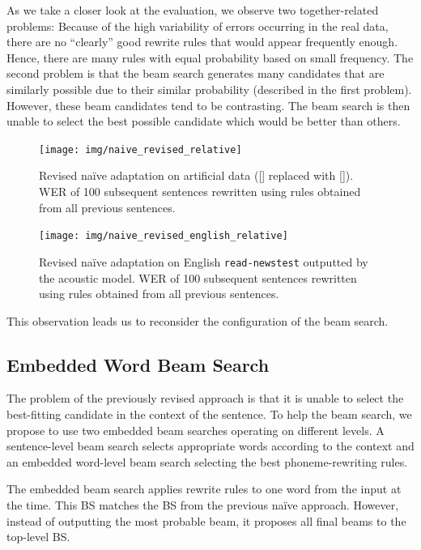 As we take a closer look at the evaluation, we observe two together-related problems: Because of the high variability of errors occurring in the real data, there are no ``clearly'' good rewrite rules that would appear frequently enough. Hence, there are many rules with equal probability based on small frequency. The second problem is that the beam search generates many candidates that are similarly possible due to their similar probability (described in the first problem). However, these beam candidates tend to be contrasting. The beam search is then unable to select the best possible candidate which would be better than others.

\begin{figure}[h]
    \texttt{[image: img/naive\_revised\_relative]}
    \caption{Revised na\"ive adaptation on artificial data ([] replaced with []). WER of 100 subsequent sentences rewritten using rules obtained from all previous sentences.}
    \label{fig:naive_revised} 
\end{figure}

\begin{figure}[h]
    \texttt{[image: img/naive\_revised\_english\_relative]}
    \caption{Revised na\"ive adaptation on English \texttt{read-newstest} outputted by the acoustic model. WER of 100 subsequent sentences rewritten using rules obtained from all previous sentences.}
    \label{fig:naive_revised_en} 
\end{figure}

This observation leads us to reconsider the configuration of the beam search.

\subsection{Embedded Word Beam Search}
The problem of the previously revised approach is that it is unable to select the best-fitting candidate in the context of the sentence. To help the beam search, we propose to use two embedded beam searches operating on different levels. A sentence-level beam search selects appropriate words according to the context and an embedded word-level beam search selecting the best phoneme-rewriting rules.

The embedded beam search applies rewrite rules to one word from the input at the time. This BS matches the BS from the previous na\"ive approach. However, instead of outputting the most probable beam, it proposes all final beams to the top-level BS.

